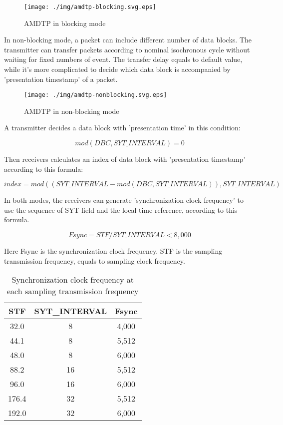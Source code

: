 \documentclass[onecolumn]{article}
\begin{document}
\begin{figure}[H]
	\centering
	\texttt{[image: ./img/amdtp-blocking.svg.eps]}
	\caption{{AMDTP in blocking mode}}
	\label{amdtp-blocking}
\end{figure}

In non-blocking mode, a packet can include different number of data blocks. The transmitter can transfer packets according to nominal isochronous cycle without waiting for fixed numbers of event. The transfer delay equals to default value, while it's more complicated to decide which data block is accompanied by 'presentation timestamp' of a packet.

\begin{figure}[H]
	\centering
	\texttt{[image: ./img/amdtp-nonblocking.svg.eps]}
	\caption{{AMDTP in non-blocking mode}}
	\label{amdtp-nonblockingstart}
\end{figure}

A transmitter decides a data block with 'presentation time' in this condition:

\begin{equation}
	mod(DBC, SYT\_INTERVAL) = 0
\end{equation}

Then receivers calculates an index of data block with 'presentation timestamp' according to this formula:

\begin{equation}
	index = mod((SYT\_INTERVAL - mod(DBC, SYT\_INTERVAL)), SYT\_INTERVAL)
\end{equation}

In both modes, the receivers can generate 'synchronization clock frequency' to use the sequence of SYT field and the local time reference, according to this formula.

\begin{equation}
	Fsync = STF / SYT\_INTERVAL < 8,000
\end{equation}

Here Fsync is the synchronization clock frequency. STF is the sampling transmission frequency, equals to sampling clock frequency.

\begin{table}[H]
	\centering
	\caption{{Synchronization clock frequency at each sampling transmission frequency}}
	\label{fsync}
	\begin{tabular}{ccc} \toprule
		STF & SYT\_INTERVAL & Fsync \\ \midrule
		32.0	& 8	& 4,000 \\
		44.1	& 8	& 5,512 \\
		48.0	& 8	& 6,000 \\
		88.2	& 16	& 5,512 \\
		96.0	& 16	& 6,000 \\
		176.4	& 32	& 5,512 \\
		192.0	& 32	& 6,000 \\ \bottomrule
	\end{tabular}
\end{table}
\end{document}
